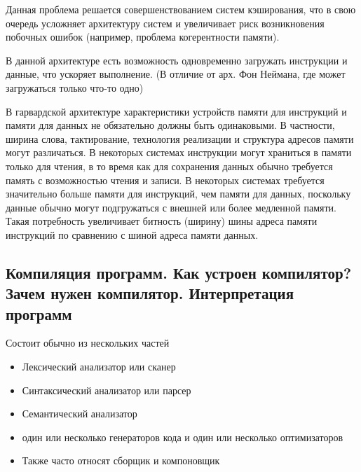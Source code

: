 \documentclass{article}
\begin{document}
Данная проблема решается совершенствованием систем кэширования, что в свою очередь усложняет архитектуру систем и увеличивает риск возникновения побочных ошибок (например, проблема когерентности памяти).


В данной архитектуре есть возможность одновременно загружать инструкции и данные, что ускоряет выполнение. (В отличие от арх. Фон Неймана, где может загружаться только что-то одно)

В гарвардской архитектуре характеристики устройств памяти для инструкций и памяти для данных не обязательно должны быть одинаковыми. В частности, ширина слова, тактирование, технология реализации и структура адресов памяти могут различаться. В некоторых системах инструкции могут храниться в памяти только для чтения, в то время как для сохранения данных обычно требуется память с возможностью чтения и записи. В некоторых системах требуется значительно больше памяти для инструкций, чем памяти для данных, поскольку данные обычно могут подгружаться с внешней или более медленной памяти. Такая потребность увеличивает битность (ширину) шины адреса памяти инструкций по сравнению с шиной адреса памяти данных.

\subsection{Компиляция программ. Как устроен компилятор? Зачем нужен
компилятор. Интерпретация программ}


Состоит обычно из нескольких частей

\begin{itemize}
    \item Лексический анализатор или сканер
    \item Синтаксический анализатор или парсер
    \item Семантический анализатор
    \item один или несколько генераторов кода и один или несколько оптимизаторов
    \item Также часто относят сборщик и компоновщик
\end{itemize}
\end{document}
